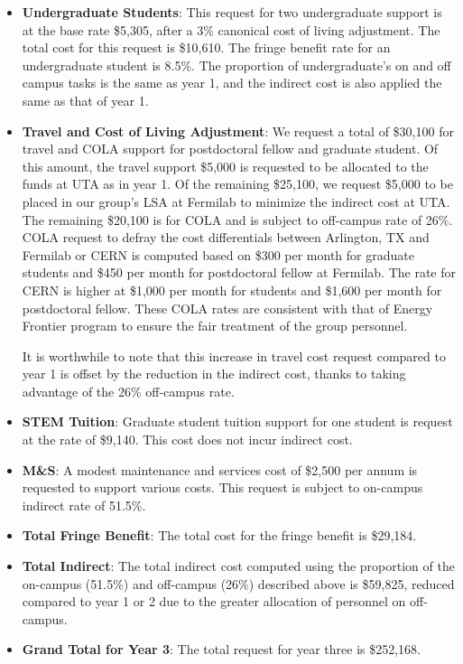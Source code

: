 \begin{enumerate}
\begin{itemize}[noitemsep,nolistsep]
\item {{\bf Undergraduate Students}: This request for two undergraduate support is at the base rate \$5,305, after a 3\% canonical cost of living adjustment.  The total cost for this request is \$10,610.  The fringe benefit rate for an undergraduate student is 8.5\%.  The proportion of undergraduate’s on and off campus tasks is the same as year 1, and the indirect cost is also applied the same as that of year 1.}

\item{{\bf Travel and Cost of Living Adjustment}: We request a total of \$30,100 for travel and COLA support for postdoctoral fellow and graduate student.   Of this amount, the travel support \$5,000 is requested to be allocated to the funds at UTA as in year 1.  Of the remaining \$25,100, we request \$5,000 to be placed in our group’s LSA at Fermilab to minimize the indirect cost at UTA.   The remaining \$20,100 is for COLA and is subject to off-campus rate of 26\%.  COLA request to defray the cost differentials between Arlington, TX and Fermilab or CERN is computed based on \$300 per month for graduate students and \$450 per month for postdoctoral fellow at Fermilab.  The rate for CERN is higher at \$1,000 per month for students and \$1,600 per month for postdoctoral fellow.  These COLA rates are consistent with that of Energy Frontier program to ensure the fair treatment of the group personnel.  

It is worthwhile to note that this increase in travel cost request compared to year 1 is offset by the reduction in the indirect cost, thanks to taking advantage of the 26\% off-campus rate.}

\item {{\bf STEM Tuition}: Graduate student tuition support for one student is request at the rate of \$9,140.  This cost does not incur indirect cost.}

\item {{\bf M\&S}: A modest maintenance and services cost of \$2,500 per annum is requested to support various costs.   This request is subject to on-campus indirect rate of 51.5\%.}

\item {{\bf Total Fringe Benefit}: The total cost for the fringe benefit is \$29,184.}

\item {{\bf Total Indirect}: The total indirect cost computed using the proportion of the on-campus (51.5\%) and off-campus (26\%) described above is \$59,825, reduced compared to year 1 or 2 due to the greater allocation of personnel on off-campus.}

\item {{\bf Grand Total for Year 3}: The total request for year three is \$252,168.}

\end{itemize}

\end{enumerate}

